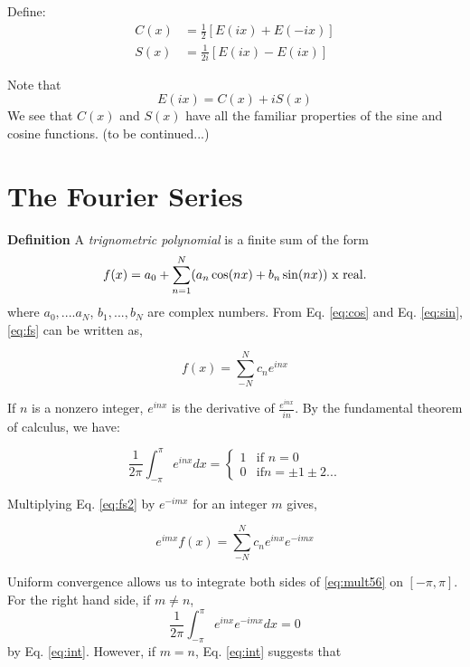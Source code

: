 \documentclass{article}
\begin{document}
Define:
\begin{align}
\label{eq:cos}
C(x)&=\frac{1}{2}[E(ix)+E(-ix)]\\
\label{eq:sin}
S(x)&=\frac{1}{2i}[E(ix)-E(ix)]
\end{align}

Note that 
\begin{equation}
E(ix)=C(x)+iS(x)
\end{equation}
We see that $C(x)$ and $S(x)$ have all the familiar properties of the sine and cosine functions.  (to be continued...)


\section{The Fourier Series}
\textbf{Definition}  A \emph{trignometric polynomial} is a finite sum of the form 
\begin{equation}
\label{eq:fs}
f(x)=a_0 +\sum_{n=1}^N(a_n\cos(nx)+b_n \sin(nx)) \hbox{   x real}.
\end{equation}
where $a_0,....a_N$, $b_1,...,b_N$ are complex numbers.  From Eq. \ref{eq:cos} and Eq. \ref{eq:sin}, \ref{eq:fs} can be written as,

\begin{equation}
\label{eq:fs2}
f(x)=\sum^N_{-N}c_ne^{inx}
\end{equation}

If $n$ is a nonzero integer, $e^{inx} $ is the derivative of $\frac{e^{inx}}{in}$.  By the fundamental theorem of calculus, we have:

\begin{equation}
\label{eq:int}
\frac{1}{2\pi}\int^\pi_{-\pi} e^{inx}dx = \begin{cases} 1 & \text{if } n=0\\
        						   0 & \text{if} n=\pm 1 \pm 2 ...
\end{cases}
\end{equation}

Multiplying Eq. \ref{eq:fs2} by $e^{-imx}$ for an integer $m$ gives, 

\begin{equation}
\label{eq:mult56}
e^{imx}f(x)=\sum^N_{-N}c_ne^{inx}e^{-imx}
\end{equation}

Uniform convergence allows us to integrate both sides of \ref{eq:mult56} on $[-\pi, \pi]$.  For the right hand side, if $m\neq n$, 
\begin{equation}
\label{eq:zero}
\frac{1}{2\pi}\int^\pi_{-\pi} e^{inx}e^{-imx}dx =0
\end{equation}
by Eq. \ref{eq:int}.  However, if $m=n$, Eq. \ref{eq:int} suggests that 
\end{document}
